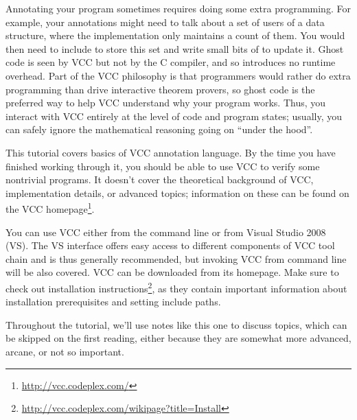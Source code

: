 Annotating your program sometimes requires doing some extra
programming.  For example, your annotations might need to talk about a
set of users of a data structure, where the implementation only
maintains a count of them.  You would then need to include  to store this set and write small bits of  to
update it.  Ghost code is seen by VCC but not by the C compiler, and
so introduces no runtime overhead. Part of the VCC philosophy is that
programmers would rather do extra programming than drive interactive
theorem provers, so ghost code is the preferred way to help VCC
understand why your program works.  Thus, you interact with VCC
entirely at the level of code and program states; usually, you can
safely ignore the mathematical reasoning going on ``under the hood''.

This tutorial covers basics of VCC annotation language. By the time
you have finished working through it, you should be able to use VCC to
verify some nontrivial programs. It doesn't cover the theoretical
background of VCC, implementation details, or advanced topics;
information on these can be found on the VCC
homepage\footnote{\url{http://vcc.codeplex.com/}}.


You can use VCC either from the command line or from Visual Studio
2008 (VS).
The VS interface offers easy access to different components of
VCC tool chain and is thus generally recommended,
but invoking VCC from command line will be also covered.
VCC can be downloaded from its homepage.
Make sure to check out installation instructions\footnote{\url{http://vcc.codeplex.com/wikipage?title=Install}},
as they contain important information about installation prerequisites 
and setting include paths.


\begin{note}
  Throughout the tutorial, we'll use notes like this one to discuss
  topics, which can be skipped on the first reading, either because
  they are somewhat more advanced, arcane, or not so important.
\end{note}

